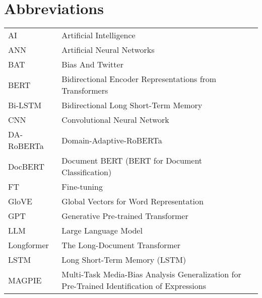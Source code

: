 \documentclass[master=mai,masteroption=slt]{kulemt}
\begin{document}
\section*{Abbreviations}
\begin{flushleft}
    \renewcommand{\arraystretch}{1.1}
    \begin{tabularx}{\textwidth}{@{}p{30mm}X@{}}
        AI         & Artificial Intelligence                                                                     \\
        ANN        & Artificial Neural Networks                                                                  \\
        BAT        & Bias And Twitter                                                                            \\
        BERT       & Bidirectional Encoder Representations from Transformers                                     \\
        Bi-LSTM    & Bidirectional Long Short-Term Memory                                                        \\
        CNN        & Convolutional Neural Network                                                                \\
        DA-RoBERTa & Domain-Adaptive-RoBERTa                                                                     \\
        DocBERT    & Document BERT (BERT for Document Classification)                                            \\
        FT         & Fine-tuning                                                                                 \\
        GloVE      & Global Vectors for Word Representation                                                      \\
        GPT        & Generative Pre-trained Transformer                                                          \\
        LLM        & Large Language Model                                                                        \\
        Longformer & The Long-Document Transformer                                                               \\
        LSTM       & Long Short-Term Memory (LSTM)                                                               \\
        MAGPIE     & Multi-Task Media-Bias Analysis Generalization for Pre-Trained Identification of Expressions \\

\end{tabularx}
\end{flushleft}
\end{document}
